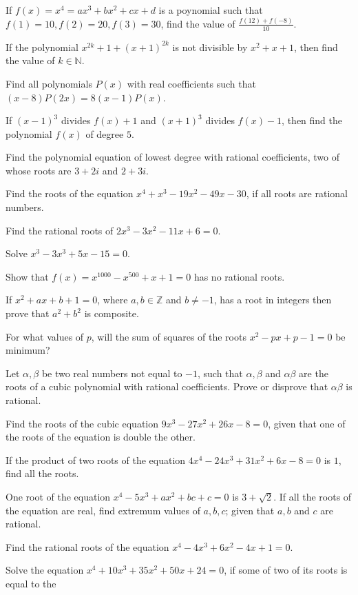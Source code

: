 \item If $f(x) = x^4 = ax^3 + bx^2 + cx + d$ is a poynomial such that $f(1) = 10, f(2) = 20, f(3) = 30$,
  find the value of $\frac{f(12) + f(-8)}{10}$.
\item If the polynomial $x^{2k} + 1 + (x + 1)^{2k}$ is not divisible by $x^2 + x + 1$, then find the value
  of $k\in\mathbb{N}$.
\item Find all polynomials $P(x)$ with real coefficients such that $(x - 8)P(2x) = 8(x - 1)P(x)$.
\item If $(x - 1)^3$ divides $f(x) + 1$ and $(x + 1)^3$ divides $f(x) - 1$, then find the polynomial $f(x)$
  of degree $5$.
\item Find the polynomial equation of lowest degree with rational coefficients, two of whose roots are $3 +
  2i$ and $2 + 3i$.
\item Find the roots of the equation $x^4 + x^3 -19x^2 - 49x - 30$, if all roots are rational numbers.
\item Find the rational roots of $2x^3 - 3x^2 - 11x + 6 = 0$.
\item Solve $x^3 - 3x^3 + 5x - 15 = 0$.
\item Show that $f(x) = x^{1000} - x^{500} + x + 1 = 0$ has no rational roots.
\item If $x^2 + ax + b + 1 = 0$, where $a, b\in\mathbb{Z}$ and $b\neq -1$, has a root in integers then prove
  that $a^2 + b^2$ is composite.
\item For what values of $p$, will the sum of squares of the roots $x^2 - px + p - 1 = 0$ be minimum?
\item Let $\alpha, \beta$ be two real numbers not equal to $-1$, such that $\alpha, \beta$ and $\alpha\beta$
  are the roots of a cubic polynomial with rational coefficients. Prove or disprove that $\alpha\beta$ is
  rational.
\item Find the roots of the cubic equation $9x^3 - 27x^2 + 26x - 8 = 0$, given that one of the roots of the
  equation is double the other.
\item If the product of two roots of the equation $4x^4 - 24x^3 + 31x^2 + 6x - 8 = 0$ is $1$, find all the
  roots.
\item One root of the equation $x^4 - 5x^3 + ax^2 + bc + c = 0$ is $3 + \sqrt{2}$. If all the roots of the
  equation are real, find extremum values of $a, b, c$; given that $a, b$ and $c$ are rational.
\item Find the rational roots of the equation $x^4 - 4x^3 + 6x^2 - 4x + 1 = 0$.
\item Solve the equation $x^4 + 10x^3 + 35x^2 + 50x + 24 = 0$, if some of two of its roots is equal to the
